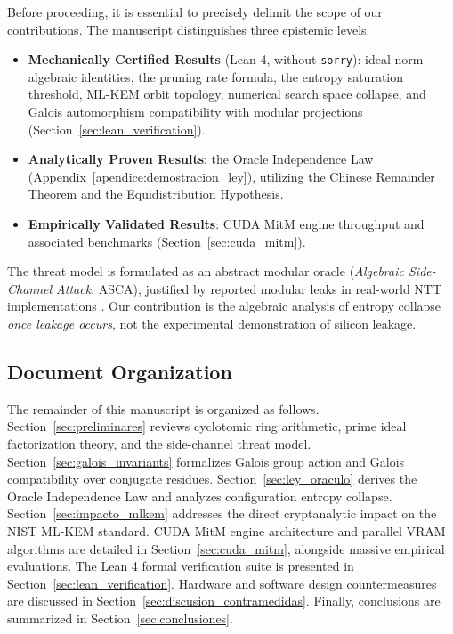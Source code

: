 \documentclass[11pt,a4paper]{article}
\theoremstyle{plain}
\theoremstyle{definition}
\numberwithin{equation}{section}
\begin{document}
Before proceeding, it is essential to precisely delimit the scope of our contributions. The manuscript distinguishes three epistemic levels:
\begin{itemize}
    \item \textbf{Mechanically Certified Results} (Lean 4, without \texttt{sorry}): ideal norm algebraic identities, the pruning rate formula, the entropy saturation threshold, ML-KEM orbit topology, numerical search space collapse, and Galois automorphism compatibility with modular projections (Section~\ref{sec:lean_verification}).
    \item \textbf{Analytically Proven Results}: the Oracle Independence Law (Appendix~\ref{apendice:demostracion_ley}), utilizing the Chinese Remainder Theorem and the Equidistribution Hypothesis.
    \item \textbf{Empirically Validated Results}: CUDA MitM engine throughput and associated benchmarks (Section~\ref{sec:cuda_mitm}).
\end{itemize}
The threat model is formulated as an abstract modular oracle (\emph{Algebraic Side-Channel Attack}, ASCA), justified by reported modular leaks in real-world NTT implementations \cite{Ravi2020,Wenger2024}. Our contribution is the algebraic analysis of entropy collapse \emph{once leakage occurs}, not the experimental demonstration of silicon leakage.

\subsection{Document Organization}
The remainder of this manuscript is organized as follows. Section~\ref{sec:preliminares} reviews cyclotomic ring arithmetic, prime ideal factorization theory, and the side-channel threat model. Section~\ref{sec:galois_invariants} formalizes Galois group action and Galois compatibility over conjugate residues. Section~\ref{sec:ley_oraculo} derives the Oracle Independence Law and analyzes configuration entropy collapse. Section~\ref{sec:impacto_mlkem} addresses the direct cryptanalytic impact on the NIST ML-KEM standard. CUDA MitM engine architecture and parallel VRAM algorithms are detailed in Section~\ref{sec:cuda_mitm}, alongside massive empirical evaluations. The Lean 4 formal verification suite is presented in Section~\ref{sec:lean_verification}. Hardware and software design countermeasures are discussed in Section~\ref{sec:discusion_contramedidas}. Finally, conclusions are summarized in Section~\ref{sec:conclusiones}.
\end{document}
